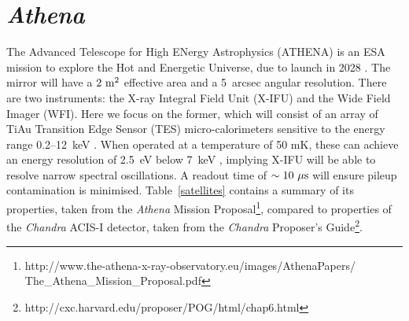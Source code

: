 \documentclass[fleqn,usenatbib,useAMS]{mnras}
\begin{document}
\begin{figure*}
\end{figure*}

\section{{\it Athena}}
\label{athena}
The Advanced Telescope for High ENergy Astrophysics (ATHENA) is an ESA mission to explore the Hot and Energetic Universe, due to launch in 2028 \cite{Nandra:2013shg}. The mirror will have a $2~\rm{m}^2$ effective area and a 5~arcsec angular resolution. There are two instruments: the X-ray Integral Field Unit (X-IFU) and the Wide Field Imager (WFI). Here we focus on the former, which will consist of an array of TiAu Transition Edge Sensor (TES) micro-calorimeters sensitive to the energy range 0.2--12~keV \cite{Barret:2016ett}. When operated at a temperature of 50 mK, these can achieve an energy resolution of 2.5~eV below 7~keV \cite{Gottardi:2016cdx}, implying X-IFU will be able to resolve narrow spectral oscillations. A readout time of $\sim10~\mu\rm{s}$ will ensure pileup contamination is minimised. Table~\ref{satellites} contains
a summary of its properties, taken from the {\it Athena} Mission Proposal\footnote{http://www.the-athena-x-ray-observatory.eu/images/AthenaPapers/ \\ The\_Athena\_Mission\_Proposal.pdf}, compared to properties of the {\it Chandra} ACIS-I detector, taken from the {\it Chandra} Proposer's Guide\footnote{http://cxc.harvard.edu/proposer/POG/html/chap6.html}.
\end{document}
